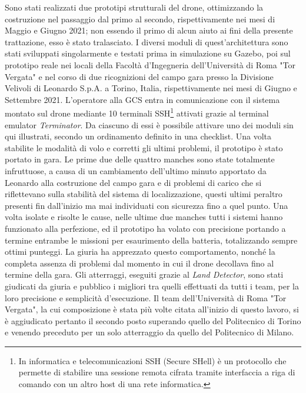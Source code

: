 \indent Sono stati realizzati due prototipi strutturali del drone, ottimizzando la costruzione nel passaggio dal primo al secondo, rispettivamente nei mesi di Maggio e Giugno 2021; non essendo il primo di alcun aiuto ai fini della presente trattazione, esso è stato tralasciato. I diversi moduli di quest'architettura sono stati sviluppati singolarmente e testati prima in simulazione su Gazebo, poi sul prototipo reale nei locali della Facoltà d'Ingegneria dell'Università di Roma "Tor Vergata" e nel corso di due ricognizioni del campo gara presso la Divisione Velivoli di Leonardo S.p.A. a Torino, Italia, rispettivamente nei mesi di Giugno e Settembre 2021. L'operatore alla GCS entra in comunicazione con il sistema montato sul drone mediante 10 terminali SSH\footnote{In informatica e telecomunicazioni SSH (Secure SHell) è un protocollo che permette di stabilire una sessione remota cifrata tramite interfaccia a riga di comando con un altro host di una rete informatica.} attivati grazie al terminal emulator \emph{Terminator}. Da ciascuno di essi è possibile attivare uno dei moduli sin qui illustrati, secondo un ordinamento definito in una checklist. Una volta stabilite le modalità di volo e corretti gli ultimi problemi, il prototipo è stato portato in gara. Le prime due delle quattro manches sono state totalmente infruttuose, a causa di un cambiamento dell'ultimo minuto apportato da Leonardo alla costruzione del campo gara e di problemi di carico che si riflettevano sulla stabilità del sistema di localizzazione, questi ultimi peraltro presenti fin dall'inizio ma mai individuati con sicurezza fino a quel punto. Una volta isolate e risolte le cause, nelle ultime due manches tutti i sistemi hanno funzionato alla perfezione, ed il prototipo ha volato con precisione portando a termine entrambe le missioni per esaurimento della batteria, totalizzando sempre ottimi punteggi. La giuria ha apprezzato questo comportamento, nonché la completa assenza di problemi dal momento in cui il drone decollava fino al termine della gara. Gli atterraggi, eseguiti grazie al \emph{Land Detector}, sono stati giudicati da giuria e pubblico i migliori tra quelli effettuati da tutti i team, per la loro precisione e semplicità d'esecuzione. Il team dell'Università di Roma "Tor Vergata", la cui composizione è stata più volte citata all'inizio di questo lavoro, si è aggiudicato pertanto il secondo posto superando quello del Politecnico di Torino e venendo preceduto per un solo atterraggio da quello del Politecnico di Milano.
